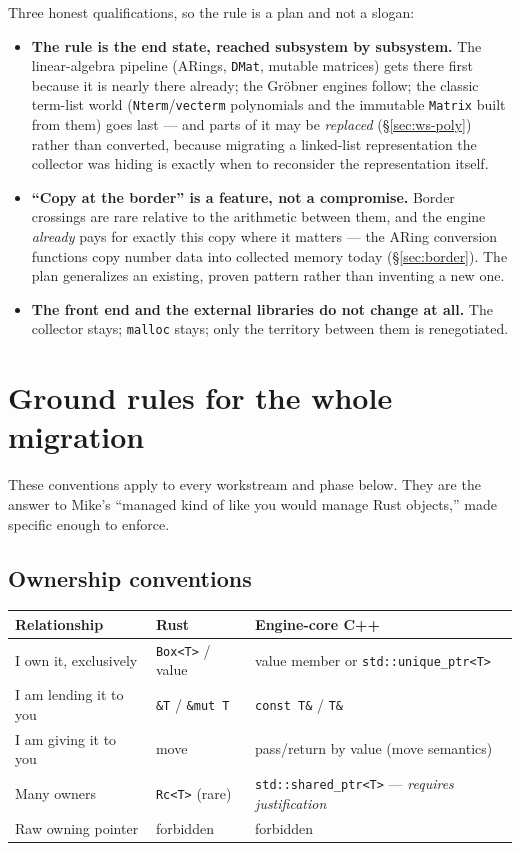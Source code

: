 \documentclass[11pt,oneside]{report}
\newcommand{\code}[1]{\textcolor{m2code}{\texttt{#1}}}
\begin{document}
Three honest qualifications, so the rule is a plan and not a slogan:

\begin{itemize}
\item \textbf{The rule is the end state, reached subsystem by subsystem.} The
  linear-algebra pipeline (ARings, \code{DMat}, mutable matrices) gets there
  first because it is nearly there already; the Gr\"obner engines follow; the
  classic term-list world (\code{Nterm}/\code{vecterm} polynomials and the
  immutable \code{Matrix} built from them) goes last --- and parts of it may
  be \emph{replaced} (\S\ref{sec:ws-poly}) rather than converted, because
  migrating a linked-list representation the collector was hiding is exactly
  when to reconsider the representation itself.
\item \textbf{``Copy at the border'' is a feature, not a compromise.} Border
  crossings are rare relative to the arithmetic between them, and the engine
  \emph{already} pays for exactly this copy where it matters --- the ARing
  conversion functions copy number data into collected memory today
  (\S\ref{sec:border}). The plan generalizes an existing, proven pattern
  rather than inventing a new one.
\item \textbf{The front end and the external libraries do not change at all.}
  The collector stays; \code{malloc} stays; only the territory between them is
  renegotiated.
\end{itemize}

\section{Ground rules for the whole migration}
\label{sec:groundrules}

These conventions apply to every workstream and phase below. They are the
answer to Mike's ``managed kind of like you would manage Rust objects,'' made
specific enough to enforce.

\subsection{Ownership conventions}
\label{sec:ownership}

\begin{center}
\small
\begin{tabular}{@{}lll@{}}
\toprule
\textbf{Relationship} & \textbf{Rust} & \textbf{Engine-core C++} \\
\midrule
I own it, exclusively & \code{Box<T>} / value & value member or \code{std::unique\_ptr<T>} \\
I am lending it to you & \code{\&T} / \code{\&mut T} & \code{const T\&} / \code{T\&} \\
I am giving it to you & move & pass/return by value (move semantics) \\
Many owners & \code{Rc<T>} (rare) & \code{std::shared\_ptr<T>} --- \emph{requires justification} \\
Raw owning pointer & forbidden & forbidden \\
\bottomrule
\end{tabular}
\end{center}
\end{document}
